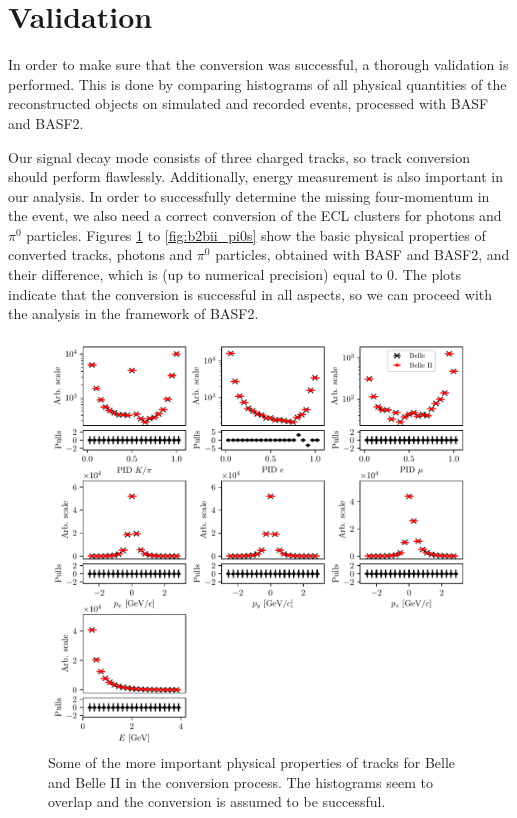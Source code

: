 \section{Validation}

In order to make sure that the conversion was successful, a thorough validation is performed. This is done by comparing histograms of all physical quantities of the reconstructed objects on simulated and recorded events, processed with BASF and BASF2. 

Our signal decay mode consists of three charged tracks, so track conversion should perform flawlessly. Additionally, energy measurement is also important in our analysis. In order to successfully determine the missing four-momentum in the event, we also need a correct conversion of the ECL clusters for photons and $\pi^0$ particles. Figures \ref{fig:b2bii_tracks} to \ref{fig:b2bii_pi0s} show the basic physical properties of converted tracks, photons and $\pi^0$ particles, obtained with BASF and BASF2, and their difference, which is (up to numerical precision) equal to 0. The plots indicate that the conversion is successful in all aspects, so we can proceed with the analysis in the framework of BASF2.

\begin{figure}[H]
	\centering
	\captionsetup{width=0.8\linewidth}
	\includegraphics[width=\linewidth]{fig/b2bii_tracks}
	\caption{Some of the more important physical properties of tracks for Belle and Belle II in the conversion process. The histograms seem to overlap and the conversion is assumed to be successful.}
	\label{fig:b2bii_tracks}
\end{figure}

